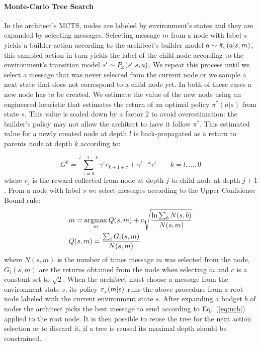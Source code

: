 \paragraph{Monte-Carlo Tree Search }
In the architect's MCTS, nodes are labeled by environment's states and they are expanded by selecting messages. Selecting message $m$ from a node with label $s$ yields a builder action according to the architect's builder model $a\sim \tilde{\pi}_{\!_B}(a|s,m)$, this sampled action in turn yields the label of the child node according to the environment's transition model $s'\sim P_{\!_E}(s'|s,a)$. We repeat this process until we select a message that was never selected from the current node  or we sample a next state that does not correspond to a child node yet. In both of these cases a new node has to be created. We estimate the value of the new node using an engineered heuristic that estimates the return of an optimal policy $\pi^*(a|s)$ from state $s$. This value is scaled down by a factor 2 to avoid overestimation: the builder's policy may not allow the architect to have it follow $\pi^*$. This estimated value for a newly created node at depth $l$ is back-propagated as a return to parents node at depth $k$ according to:

\begin{equation}
    G^k=\sum_{\tau=0}^{l-1-k}\gamma^\tau r_{k+1+\tau} + \gamma^{l-k}v^l \qquad k=l,...,0
\end{equation}
where $r_j$ is the reward collected from node at depth $j$ to child node at depth $j+1$.  
From a node with label $s$ we select messages according to the Upper Confidence Bound rule: 
\begin{equation}
\label{eq:ucb}
\begin{split}
&m = \operatorname*{argmax}_m Q(s,m) + c \sqrt{\frac{\ln \sum_b N(s,b)}{N(s,m)}}\\
&Q(s,m) = \frac{\sum_iG_i(s,m)}{N(s,m)}
\end{split}
\end{equation}
where $N(s,m)$ is the number of times message $m$ was selected from the node, $G_i(s,m)$ are the returns obtained from the node when selecting $m$ and $c$ is a constant set to $\sqrt{2}$.
When the architect must choose a message from the environment state $s$, its policy $\pi_{\!_A}(m|s)$ runs the above procedure from a root node labeled with the current environment state $s$. After expanding a budget $b$ of nodes the architect picks the best message to send according to Eq.~(\ref{eq:ucb}) applied to the root node. It is then possible to reuse the tree for the next action selection or to discard it, if a tree is reused its maximal depth should be constrained.

